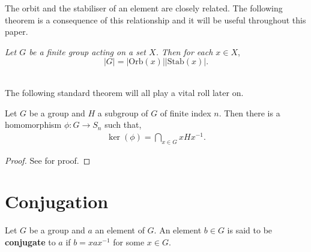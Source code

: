 The orbit and the stabiliser of an element are closely related. The following theorem is a consequence of this relationship and it will be useful throughout this paper. \\

\begin{theorem} 
    \textit{Let $G$ be a finite group acting on a set $X$. Then for each $x \in X$}, $$|G| = |\text{Orb}(x)| |\text{Stab}(x)|.$$ \\
\end{theorem}

The following standard theorem will all play a vital roll later on.

\begin{theorem}\label{symhomoker} Let $G$ be a group and $H$ a subgroup of $G$ of finite index $n$. Then there is a homomorphism $\phi : G \longrightarrow S_n$ such that,
\begin{align*} \ker(\phi) = \bigcap\limits_{x \in G} x H x^{-1}.
\end{align*}
\end{theorem}

\begin{proof} See \cite[p.110]{bhattacharya} for proof.
\end{proof}

\section{Conjugation}

\begin{definition}
Let $G$ be a group and $a$ an element of $G$. An element $b \in G$ is said to be \textbf{conjugate} to $a$ if $b=xax^{-1}$ for some $x \in G$. \\
\end{definition}

